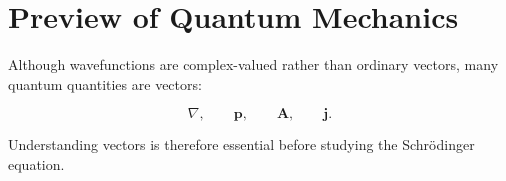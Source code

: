 \section{Preview of Quantum Mechanics}

Although wavefunctions are complex-valued rather than ordinary vectors,
many quantum quantities are vectors:

\[
\nabla,
\qquad
\mathbf p,
\qquad
\mathbf A,
\qquad
\mathbf j.
\]

Understanding vectors is therefore essential before studying the Schrödinger equation.

